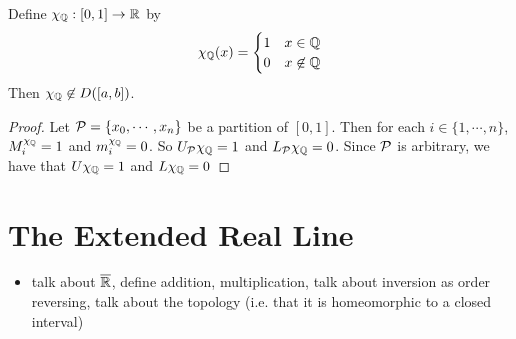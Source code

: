 \documentclass{book}
\begin{document}
	\begin{ex}  
		Define $\chi_{\mathbb{Q}}:[0,1] \rightarrow \mathbb{R}$ by $$\chi_{\mathbb{Q}}(x) = \begin{cases}
			1 & x \in \mathbb{Q} \\
			0 & x \not \in \mathbb{Q}
		\end{cases}$$
		Then $\chi_{\mathbb{Q}} \not \in D([a,b])$.
	\end{ex}

	\begin{proof}
		Let $\mathcal{P} = \{x_0, \cdots, x_n\}$ be a partition of $[0,1]$. Then for each $i \in \{1, \cdots, n\}$, $M^{\chi_{\mathbb{Q}}}_i = 1$ and $m^{\chi_{\mathbb{Q}}}_i = 0$. So $U_{\mathcal{P}} \chi_{\mathbb{Q}} = 1$ and $L_{\mathcal{P}} \chi_{\mathbb{Q}} = 0$. Since $\mathcal{P}$ is arbitrary, we have that $U \chi_{\mathbb{Q}} = 1$ and $L \chi_{\mathbb{Q}} = 0$
	\end{proof}

	
	
	
	
	
	
	
	
	
	
	
	
	
	
	
	
	
	
	
	
	
	
	
	
	
	
	
	
	
	
	
	
	
	
	
	
	
	
	
	
	
	
	
	\newpage
	\section{The Extended Real Line}
	
	\begin{itemize}
		\item talk about $\overline{\mathbb{R}}$, define addition, multiplication, talk about inversion as order reversing, talk about the topology (i.e. that it is homeomorphic to a closed interval)
	\end{itemize}
	
	
	
	
	
	
	
	
	
	
	
\end{document}
